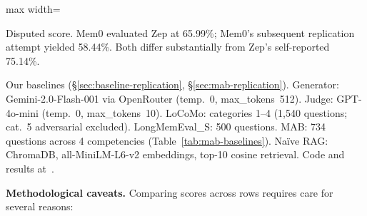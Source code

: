 \begin{table}[!t]
\begin{adjustbox}{max width=\textwidth}
\begin{threeparttable}
\begin{tablenotes}[flushleft]
\item[g] Disputed score.  Mem0 evaluated Zep at 65.99\%; Mem0's subsequent replication attempt yielded 58.44\%.  Both differ substantially from Zep's self-reported 75.14\%.
\item[h] Our baselines (\S\ref{sec:baseline-replication}, \S\ref{sec:mab-replication}).  Generator: Gemini-2.0-Flash-001 via OpenRouter (temp.~0, max\_tokens~512).  Judge: GPT-4o-mini (temp.~0, max\_tokens~10).  LoCoMo: categories 1--4 (1{,}540 questions; cat.~5 adversarial excluded).  LongMemEval\_S: 500 questions.  MAB: 734 questions across 4 competencies (Table~\ref{tab:mab-baselines}).  Na\"ive RAG: ChromaDB, all-MiniLM-L6-v2 embeddings, top-10 cosine retrieval.  Code and results at~\cite{alaya2026}.
\end{tablenotes}
\end{threeparttable}
\end{adjustbox}
\end{table}


\smallskip
\noindent\textbf{Methodological caveats.}\enspace
Comparing scores across rows requires care for several reasons:

